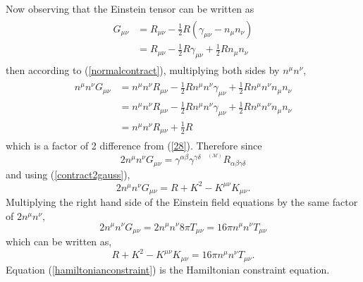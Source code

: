 \documentclass[11pt]{article}
\newcommand{\sttensor}{\text{ }{\scriptscriptstyle ^{^{(\mathcal{M})}}}}
\numberwithin{equation}{section}
\begin{document}
Now observing that the Einstein tensor can be written as
\begin{align}
\begin{split}
    G_{\mu\nu} &= R_{\mu\nu} - \frac12R(\gamma_{\mu\nu} - n_{\mu}n_{\nu}) \\
               &= R_{\mu\nu} - \frac12 R\gamma_{\mu\nu} + \frac12R n_{\mu}n_{\nu} 
               \end{split}
\end{align}
then according to (\ref{normalcontract}), multiplying both sides by $n^{\mu} n^{\nu}$,
\begin{align}
\begin{split}
    n^{\mu}n^{\nu}G_{\mu\nu} &= n^{\mu}n^{\nu}R_{\mu\nu} - \frac12 Rn^{\mu}n^{\nu}\gamma_{\mu\nu} + \frac12R n^{\mu}n^{\nu}n_{\mu}n_{\nu} \\ &= n^{\mu}n^{\nu}R_{\mu\nu} - \frac12 Rn^{\mu}n^{\nu}\gamma_{\mu\nu} + \frac12R n^{\mu}n^{\nu}n_{\mu}n_{\nu} \\ &= n^{\mu}n^{\nu}R_{\mu\nu} + \frac12R
\end{split}
\end{align}
which is a factor of 2 difference from (\ref{28}). Therefore since
\begin{equation}
    2n^{\mu}n^{\nu}G_{\mu\nu} = \gamma^{\alpha\beta} \gamma^{\gamma\delta} \sttensor R_{\alpha\beta\gamma\delta} 
\end{equation}
and using (\ref{contract2gauss}),
\begin{equation}
    2n^{\mu}n^{\nu}G_{\mu\nu}= R + K^2 - K^{\mu\nu}K_{\mu\nu}.
\end{equation}
Multiplying the right hand side of the Einstein field equations by the same factor of $2n^{\mu}n^{\nu}$, 
\begin{equation}\label{efeRHS}
    2n^{\mu}n^{\nu}G_{\mu\nu} = 2n^{\mu}n^{\nu}8\pi T_{\mu\nu} = 16\pi n^{\mu}n^{\nu}T_{\mu\nu}
\end{equation}
which can be written as,
\begin{equation}\label{hamiltonianconstraint}
    R + K^2 - K^{\mu\nu}K_{\mu\nu} = 16\pi n^{\mu}n^{\nu}T_{\mu\nu}.
\end{equation}
Equation (\ref{hamiltonianconstraint}) is the Hamiltonian constraint equation. 
\end{document}
